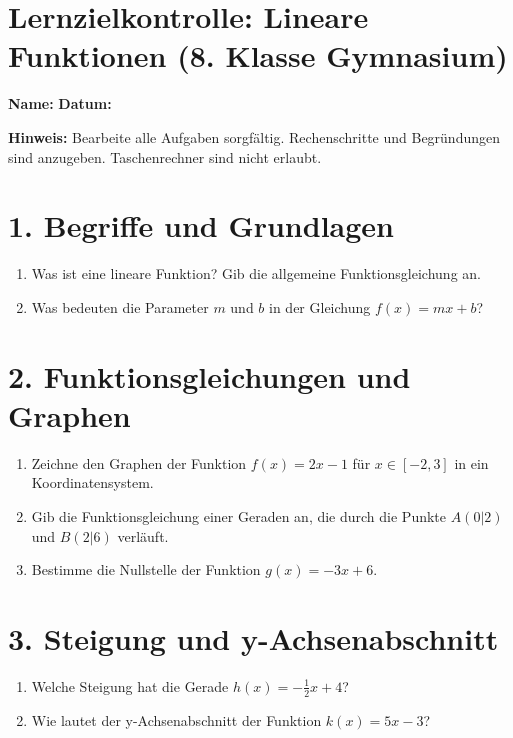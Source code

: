 \section*{Lernzielkontrolle: Lineare Funktionen (8. Klasse Gymnasium)}

\textbf{Name:} \underline{\hspace{5cm}} \hfill \textbf{Datum:} \underline{\hspace{3cm}}

\vspace{1em}

\textbf{Hinweis:} Bearbeite alle Aufgaben sorgfältig. Rechenschritte und Begründungen sind anzugeben. Taschenrechner sind nicht erlaubt.

\section*{1. Begriffe und Grundlagen}
\begin{enumerate}[label=\alph*)]
  \item Was ist eine lineare Funktion? Gib die allgemeine Funktionsgleichung an.\\[2em]
  \item Was bedeuten die Parameter $m$ und $b$ in der Gleichung $f(x) = mx + b$?\\[2em]
\end{enumerate}

\section*{2. Funktionsgleichungen und Graphen}
\begin{enumerate}[label=\alph*)]
  \item Zeichne den Graphen der Funktion $f(x) = 2x - 1$ für $x \in [-2, 3]$ in ein Koordinatensystem.\\[8em]
  \item Gib die Funktionsgleichung einer Geraden an, die durch die Punkte $A(0|2)$ und $B(2|6)$ verläuft.\\[3em]
  \item Bestimme die Nullstelle der Funktion $g(x) = -3x + 6$.\\[2em]
\end{enumerate}
\newpage
\section*{3. Steigung und y-Achsenabschnitt}
\begin{enumerate}[label=\alph*)]
  \item Welche Steigung hat die Gerade $h(x) = -\frac{1}{2}x + 4$?\\[2em]
  \item Wie lautet der y-Achsenabschnitt der Funktion $k(x) = 5x - 3$?\\[2em]
\end{enumerate}

